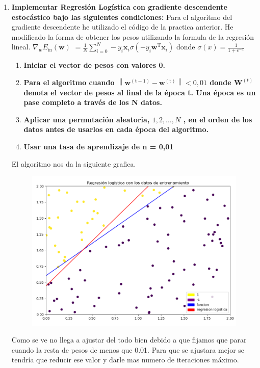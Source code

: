 \documentclass[titlepage]{article}
\begin{document}
		
		\begin{enumerate}
			\item 
			\textbf{Implementar Regresión Logística con gradiente descendente estocástico bajo las siguientes condiciones:}
			\newline
			Para el algoritmo del gradiente descendente he utilizado el código de la practica anterior. He modificado la forma de obtener los pesos utilizando la formula de la regresión lineal.
			$\nabla_{{w}} E_{\mathrm{in}}(\mathbf{w})$ 
			$=\frac{1}{N} \sum_{i=0}^{N}-y_{i} \mathbf{x}_{i} \sigma\left(-y_{i} \mathbf{w}^{\mathrm{T}} \mathbf{x}_{i}\right)$
			donde $\sigma(x)=\frac{1}{1+e^{-x}}$
			
			
			\begin{enumerate}
				\item
				\textbf{Iniciar el vector de pesos con valores 0.}
				
				\item 
				\textbf{Para el algoritmo cuando $\left\|\mathbf{w}^{(\mathrm{t}-1)}-\mathbf{w}^{(\mathrm{t})}\right\|<0,01$ donde $\mathbf{W}^{(t)}$ denota el vector de pesos al final de la época t. Una época es un pase completo a través de los N datos.}
				
				\item
				\textbf{Aplicar una permutación aleatoria, $1,2, \ldots, N$ , en el orden de los datos antes de usarlos en cada época del algoritmo.  }
				
				\item 
				\textbf{Usar una tasa de aprendizaje de n = 0,01}
			\end{enumerate}
		El algoritmo nos da la siguiente grafica.
		\begin{figure}[H]
			\centering
			\includegraphics[width=0.7\linewidth]{screenshot013}
			\caption{}
			\label{fig:screenshot013}
		\end{figure}
		Como se ve no llega a ajustar del todo bien debido a que fijamos que parar cuando la resta de pesos de menos que 0.01. Para que se ajustara mejor se tendría que reducir ese valor y darle mas numero de iteraciones máximo.
		

\end{enumerate}
\end{document}

